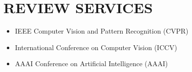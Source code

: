 \documentclass[letterpaper,11pt]{article}
\makeatletter
\newcommand{\resumeItem}[2]{
  \item\small{
    \textbf{#1}{: #2 \vspace{-2pt}}
  }
}
\newcommand{\resumeSubheading}[4]{
  \vspace{-1pt}\item
    \begin{tabular*}{0.97\textwidth}{l@{\extracolsep{\fill}}r}
      \textbf{#1} & #2 \\
      \textit{\small#3} & \textit{\small #4} \\
    \end{tabular*}\vspace{-5pt}
}
\newcommand{\resumeSubItem}[2]{\resumeItem{#1}{#2}\vspace{-4pt}}
\newcommand{\resumeSubHeadingListStart}{\begin{itemize}[leftmargin=*]}
\newcommand{\resumeSubHeadingListEnd}{\end{itemize}}
\newcommand{\resumeItemListStart}{\begin{itemize}}
\newcommand{\resumeItemListEnd}{\end{itemize}\vspace{-5pt}}
\makeatother
\begin{document}






\section{REVIEW SERVICES}
  \resumeSubHeadingListStart
  \item IEEE Computer Vision and Pattern Recognition (CVPR)
  \item International Conference on Computer Vision (ICCV)
  \item AAAI Conference on Artificial Intelligence (AAAI)
  \resumeSubHeadingListEnd
\end{document}
